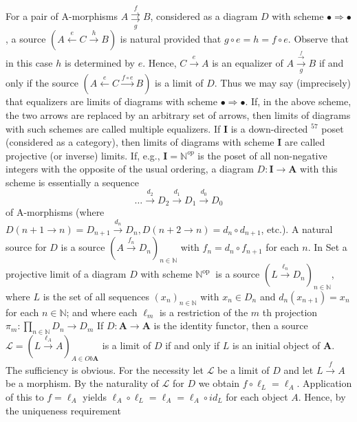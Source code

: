 \documentclass{book}
\begin{document}
\begin{enumerate}
    For a pair of A-morphisms $A \underset{g}{\stackrel{f}{\rightrightarrows}} B$, considered as a diagram $D$ with scheme $\bullet \Rightarrow \bullet$, a source $(A \stackrel{e}{\longleftarrow} C \xrightarrow{h} B)$ is natural provided that $g \circ e=h=f \circ e$. Observe that in this case $h$ is determined by $e$. Hence, $C \xrightarrow{e} A$ is an equalizer of $A \xrightarrow[g]{\stackrel{f}{\longrightarrow}} B$ if and only if the source $(A \stackrel{e}{\leftarrow} C \xrightarrow{f \circ e} B)$ is a limit of $D$. Thus we may say (imprecisely) that equalizers are limits of diagrams with scheme $\bullet \Rightarrow \bullet$. If, in the above scheme, the two arrows are replaced by an arbitrary set of arrows, then limits of diagrams with such schemes are called multiple equalizers.
    If $\mathbf{I}$ is a down-directed ${ }^{57}$ poset (considered as a category), then limits of diagrams with scheme $\mathbf{I}$ are called projective (or inverse) limits. If, e.g., $\mathbf{I}=\mathbb{N}^{o p}$ is the poset of all non-negative integers with the opposite of the usual ordering, a diagram $D: \mathbf{I} \rightarrow \mathbf{A}$ with this scheme is essentially a sequence
    $$
    \ldots \xrightarrow{d_2} D_2 \xrightarrow{d_1} D_1 \xrightarrow{d_0} D_0
    $$
    of A-morphisms (where $D(n+1 \rightarrow n)=D_{n+1} \xrightarrow{d_n} D_n, D(n+2 \rightarrow n)=d_n \circ d_{n+1}$, etc.). A natural source for $D$ is a source $\left(A \xrightarrow{f_n} D_n\right)_{n \in \mathbb{N}}$ with $f_n=d_n \circ f_{n+1}$ for each $n$. In Set a projective limit of a diagram $D$ with scheme $\mathbb{N}^{\text {op }}$ is a source $\left(L \xrightarrow{\ell_n} D_n\right)_{n \in \mathbb{N}}$, where $L$ is the set of all sequences $\left(x_n\right)_{n \in \mathbb{N}}$ with $x_n \in D_n$ and $d_n\left(x_{n+1}\right)=x_n$ for each $n \in \mathbb{N}$; and where each $\ell_m$ is a restriction of the $m$ th projection $\pi_m: \prod_{n \in \mathbb{N}} D_n \rightarrow D_m$
    If $D: \mathbf{A} \rightarrow \mathbf{A}$ is the identity functor, then a source $\mathcal{L}=\left(L \xrightarrow{\ell_A} A\right)_{A \in O b \mathbf{A}}$ is a limit of $D$ if and only if $L$ is an initial object of $\mathbf{A}$. The sufficiency is obvious. For the necessity let $\mathcal{L}$ be a limit of $D$ and let $L \xrightarrow{f} A$ be a morphism. By the naturality of $\mathcal{L}$ for $D$ we obtain $f \circ \ell_L=\ell_A$. Application of this to $f=\ell_A$ yields $\ell_A \circ \ell_L=\ell_A=\ell_A \circ i d_L$ for each object $A$. Hence, by the uniqueness requirement
\end{enumerate}
\end{document}
